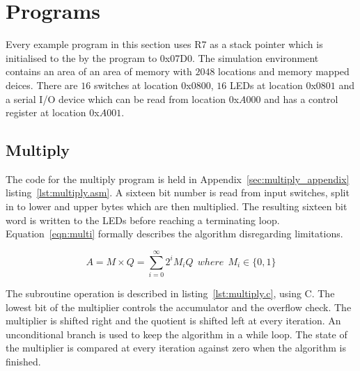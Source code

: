 

\section{Programs}
Every example program in this section uses R7 as a stack pointer which is initialised to the by the program to 0x07D0.%
The simulation environment contains an area of an area of memory with $2048$ locations and memory mapped deices.
There are $16$ switches at location $0$x$0800$, $16$ LEDs at location $0$x$0801$ and a serial I/O device which can be read from location $0$x$A000$ and has a control register at location $0$x$A001$. 




\subsection{Multiply}
\label{sec:multiply}
The code for the multiply program is held in Appendix~\ref{sec:multiply_appendix} listing~\ref{lst:multiply.asm}.
A sixteen bit number is read from input switches, split in to lower and upper bytes which are then multiplied.
The resulting sixteen bit word is written to the LEDs before reaching a terminating loop.
Equation~\eqref{eqn:multi} formally describes the algorithm disregarding limitations.

\begin{equation}
	A = M \times Q = \sum_{i=0}^{\infty} 2^i M_i Q\:\:where\:\:M_i \in \{0,1\}
   \label{eqn:multi}
\end{equation}



The subroutine operation is described in listing~\ref{lst:multiply.c}, using C. 
The lowest bit of the multiplier controls the accumulator and the overflow check.
The multiplier is shifted right and the quotient is shifted left at every iteration.
An unconditional branch is used to keep the algorithm in a while loop. 
The state of the multiplier is compared at every iteration against zero when the algorithm is finished.

\begin{minipage}{\linewidth}

\end{minipage}


